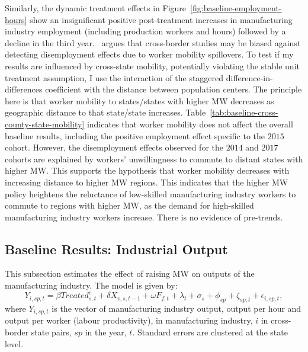 \documentclass{C:/Users/david/OneDrive/Documents/ULMS/PhD/Thesis/chapter3/src/climate_change/latex/Economic_Journal/OUP-EJ}
\begin{document}
    Similarly, the dynamic treatment effects in Figure~\ref{fig:baseline-employment-hours} show an insignificant positive post-treatment increases in manufacturing industry employment (including production workers and hours) followed by a decline in the third year.~\citet{neumark2019econometrics} argues that cross-border studies may be biased against detecting disemployment effects due to worker mobility spillovers. To test if my results are influenced by cross-state mobility, potentially violating the stable unit treatment assumption, I use the interaction of the staggered difference-in-differences coefficient with the distance between population centers. The principle here is that worker mobility to states/states with higher MW decreases as geographic distance to that state/state increases. Table~\ref{tab:baseline-cross-county-state-mobility} indicates that worker mobility does not affect the overall baseline results, including the positive employment effect specific to the $2015$ cohort. However, the disemployment effects observed for the $2014$ and $2017$ cohorts are explained by workers' unwillingness to commute to distant states with higher MW. This supports the hypothesis that worker mobility decreases with increasing distance to higher MW regions. This indicates that the higher MW policy heightens the reluctance of low-skilled manufacturing industry workers to commute to regions with higher MW, as the demand for high-skilled manufacturing industry workers increase. There is no evidence of pre-trends.
    
    

    \subsection{Baseline Results: Industrial Output}\label{subsec:baseline-results-industrial-output}
    This subsection estimates the effect of raising MW on outputs of the manufacturing industry. The model is given by:
    \begin{equation}
        Y_{i,sp,t} = \beta Treated_{s,t}^e + \delta X_{v,s,t-1} + \omega F_{f,t} + \lambda_{t} + \sigma_{s} + \phi_{sp} + \zeta_{sp,t} + \epsilon_{i,sp,t},\label{eq:baseline-output}
    \end{equation}
    where $Y_{i,sp,t}$ is the vector of manufacturing industry output, output per hour and output per worker (labour productivity), in manufacturing industry, $i$ in cross-border state pairs, $sp$ in the year, $t$. Standard errors are clustered at the state level.
    
\end{document}
